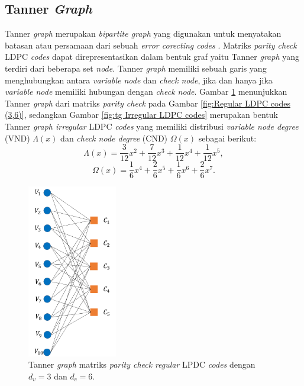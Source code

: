 \subsection{Tanner\textit{ Graph}}
Tanner\textit{ graph} merupakan \textit{bipartite graph} yang digunakan untuk menyatakan batasan atau persamaan dari sebuah \textit{error corecting codes} \cite{tann1}. Matriks \textit{parity check} LDPC \textit{codes} dapat direpresentasikan dalam bentuk graf yaitu Tanner\textit{ graph} yang terdiri dari beberapa set \textit{node}. Tanner\textit{ graph} memiliki sebuah garis yang menghubungkan antara \textit{variable node} dan \textit{check node}, jika dan hanya jika \textit{variable node} memiliki hubungan dengan \textit{check node}. Gambar \ref{fig:Tanner Graph LDPC Regular (3,6)} menunjukkan Tanner\textit{ graph} dari matriks \textit{parity check} pada Gambar \ref{fig:Regular LDPC codes (3,6)}, sedangkan Gambar \ref{fig:tg Irregular LDPC codes} merupakan bentuk Tanner\textit{ graph irregular} LDPC \textit{codes} yang memiliki distribusi \textit{variable node degree} (VND) $\Lambda (x)$ dan \textit{check node degree} (CND) $\Omega (x)$ sebagai berikut:
\begin{equation}
 \Lambda (x)=\frac{3}{12}x^{2}+\frac{7}{12}x^{3}+\frac{1}{12}x^{4}+\frac{1}{12}x^{5},
\label{eq:Distribusi var nodes rregular LDPC codes}
\end{equation}
\begin{equation}
 \Omega (x)=\frac{1}{6}x^{4}+\frac{2}{6}x^{5}+\frac{1}{6}x^{6}+\frac{2}{6}x^{7}.
\label{eq:Distribusi check nodes rregular LDPC codes}
\end{equation}
\begin{figure}[tb]
	\centering
	\includegraphics[width=0.35\textwidth]
		{pics/diagram/ldpc2.png}
		\caption{Tanner\textit{ graph} matriks \textit{parity check} \textit{regular} LPDC \textit{codes} dengan $d_{v}=3$ dan $d_{c}=6$.}
	\label{fig:Tanner Graph LDPC Regular (3,6)}
\end{figure} 
